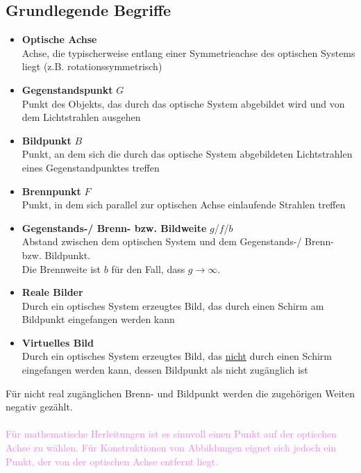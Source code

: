 \documentclass{article}
\begin{document}
\subsection{Grundlegende Begriffe}
	\begin{itemize}
		\item \textbf{Optische Achse}\\
		Achse, die typischerweise entlang einer Symmetrieachse des optischen Systems liegt (z.B. rotationssymmetrisch)


		\item \textbf{Gegenstandspunkt} $G$\\
		Punkt des Objekts, das durch das optische System abgebildet wird und von dem Lichtstrahlen ausgehen


		\item \textbf{Bildpunkt} $B$\\
		Punkt, an dem sich die durch das optische System abgebildeten Lichtstrahlen eines Gegenstandpunktes treffen


		\item \textbf{Brennpunkt} $F$\\
		Punkt, in dem sich parallel zur optischen Achse einlaufende Strahlen treffen


		\item \textbf{Gegenstands-/ Brenn- bzw. Bildweite} $g$/$f$/$b$\\
		Abstand zwischen dem optischen System und dem Gegenstands-/ Brenn- bzw. Bildpunkt.\\
		Die Brennweite ist $b$ für den Fall, dass $g\to\infty$.


		\item \textbf{Reale Bilder}\\
		Durch ein optisches System erzeugtes Bild, das durch einen Schirm am Bildpunkt eingefangen werden kann

		\item \textbf{Virtuelles Bild}\\
		Durch ein optisches System erzeugtes Bild, das \underline{nicht} durch einen Schirm eingefangen werden kann, dessen Bildpunkt als nicht zugänglich ist
	\end{itemize}

Für nicht real zugänglichen Brenn- und Bildpunkt werden die zugehörigen Weiten negativ gezählt.\\
\\
\textcolor{violet}{Für mathematische Herleitungen ist es sinnvoll einen Punkt auf der optischen Achse zu wählen. Für Konstruktionen von Abbildungen eignet sich jedoch ein Punkt, der von der optischen Achse entfernt liegt.}
\end{document}
